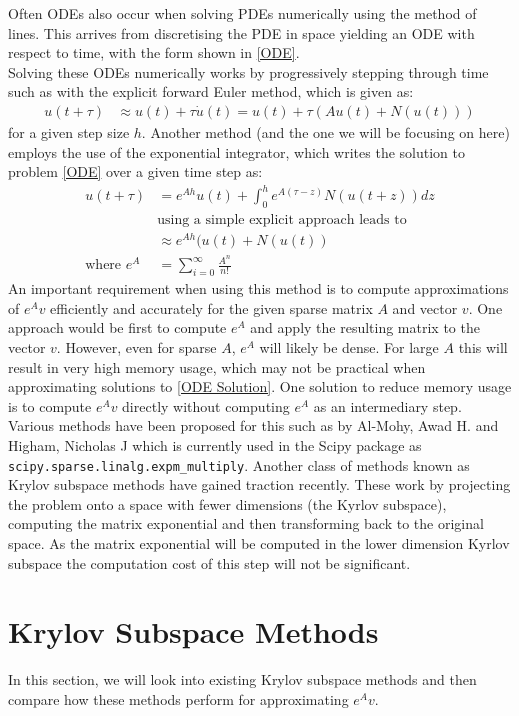 \documentclass{article}
\begin{document}
Often ODEs also occur when solving PDEs numerically using the method of lines.
This arrives from discretising the PDE in space yielding an ODE with respect to time, with the form shown in \eqref{ODE}.\\
Solving these ODEs numerically works by progressively stepping through time such as with the explicit forward Euler method, which is given as:
\begin{align*}
u(t+\tau) &\approx u(t) + \tau\dot u(t) = u(t) + \tau(Au(t) + N(u(t)))
\end{align*}
for a given step size $h$.
Another method (and the one we will be focusing on here) employs the use of the exponential integrator, which writes the solution to problem \eqref{ODE} over a given time step as:
\begin{align*}
u(t+\tau) &= e^{Ah}u(t) + \int_0^h e^{A(\tau-z)}N(u(t+z)) dz \label{ODE Solution}\\
&\text{using a simple explicit approach leads to}\\
&\approx e^{Ah}(u(t) + N(u(t))\\
\text{where } e^{A} &= \sum^{\infty}_{i = 0}\frac{A^n}{n!}
\end{align*}
An important requirement when using this method is to compute approximations of $e^{A}v$ efficiently and accurately for the given sparse matrix $A$ and vector $v$.
One approach would be first to compute $e^A$ and apply the resulting matrix to the vector $v$.
However, even for sparse $A$, $e^{A}$ will likely be dense. For large $A$ this will result in very high memory usage, which may not be practical when approximating solutions to \eqref{ODE Solution}.
One solution to reduce memory usage is to compute $e^{A}v$ directly without computing $e^{A}$ as an intermediary step.\\
Various methods have been proposed for this such as by Al-Mohy, Awad H. and Higham, Nicholas J\cite{AlMohy2011} which is currently used in the Scipy package as \verb|scipy.sparse.linalg.expm_multiply|.
Another class of methods known as Krylov subspace methods have gained traction recently\cite{Moler2003}.
These work by projecting the problem onto a space with fewer dimensions (the Kyrlov subspace), computing the matrix exponential and then transforming back to the original space.
As the matrix exponential will be computed in the lower dimension Kyrlov subspace the computation cost of this step will not be significant.
\section{Krylov Subspace Methods}
In this section, we will look into existing Krylov subspace methods and then compare how these methods perform for approximating $e^{A}v$.
\end{document}
